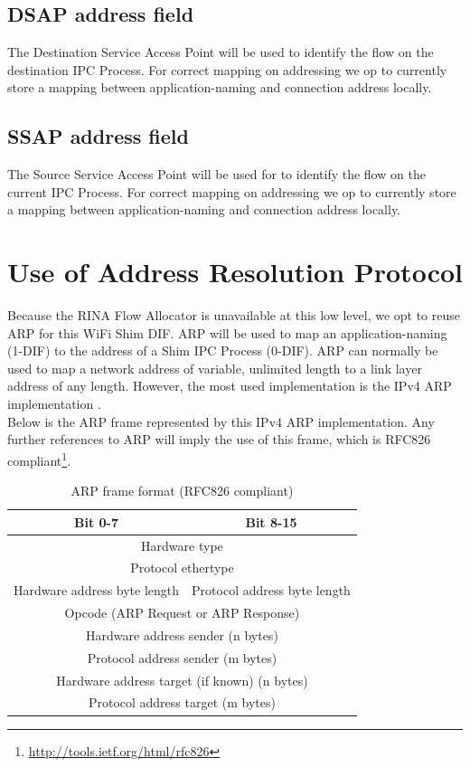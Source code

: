 \subsection{DSAP address field}

The Destination Service Access Point will be used to identify the flow on the destination IPC Process. For correct mapping on addressing we op to currently store a mapping between application-naming and connection address locally.

\subsection{SSAP address field}

The Source Service Access Point will be used for to identify the flow on the current IPC Process. For correct mapping on addressing we op to currently store a mapping between application-naming and connection address locally.

\section{Use of Address Resolution Protocol}
\label{sec:arp}

Because the RINA Flow Allocator is unavailable at this low level, we opt to reuse ARP for this WiFi Shim DIF. ARP will be used to map an application-naming (1-DIF) to the address of a Shim IPC Process (0-DIF). ARP can normally be used to map a network address of variable, unlimited length to a link layer address of any length. However, the most used implementation is the IPv4 ARP implementation \citep{arp1998}.
\\
Below is the ARP frame represented by this IPv4 ARP implementation. Any further references to ARP will imply the use of this frame, which is RFC826 compliant\footnote{\url{http://tools.ietf.org/html/rfc826}}.


\begin{table}[H]
	\begin{center}
		\begin{tabular}{|c|c|}
			\hline
				\textbf{Bit 0-7} & \textbf{Bit 8-15} \\ \hline
				\multicolumn{2}{|c|}{Hardware type} \\ \hline
				\multicolumn{2}{|c|}{Protocol ethertype} \\ \hline
				Hardware address byte length & Protocol address byte length \\ \hline
				\multicolumn{2}{|c|}{Opcode (ARP Request or ARP Response)} \\ \hline
				\multicolumn{2}{|c|}{Hardware address sender (n bytes)} \\ \hline
				\multicolumn{2}{|c|}{Protocol address sender (m bytes)} \\ \hline
				\multicolumn{2}{|c|}{Hardware address target (if known) (n bytes)} \\ \hline
				\multicolumn{2}{|c|}{Protocol address target (m bytes)} \\ \hline
		\end{tabular}
		\caption{ARP frame format (RFC826 compliant)}
	\end{center}
\end{table}


